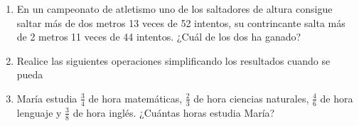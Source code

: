 \documentclass[letterpaper,11pt,twoside]{article}
\begin{document}
\begin{enumerate}
\item En un campeonato de atletismo uno de los saltadores de altura consigue saltar más de dos metros 13 veces de 52 intentos, su contrincante salta m\'{a}s de 2 metros 11 veces de 44 intentos. ¿Cu\'{a}l de los dos ha ganado?
\item Realice las siguientes operaciones simplificando los resultados cuando se pueda
\begin{enumerate}
\end{enumerate}
\item María estudia $\frac{3}{4}$ de hora matemáticas, $\frac{2}{3}$ de hora ciencias naturales, $\frac{4}{6}$ de hora lenguaje y $\frac{3}{8}$ de hora inglés. ¿Cuántas horas estudia María?

\end{enumerate}
\end{document}
